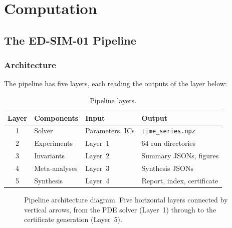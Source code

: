 \documentclass[11pt,twoside,openright]{book}
\theoremstyle{definition}
\theoremstyle{plain}
\theoremstyle{definition}
\theoremstyle{remark}
\begin{document}
\part{Computation}\label{part:computation}

\chapter{The ED-SIM-01 Pipeline}\label{ch:pipeline}

\section{Architecture}

The pipeline has five layers, each reading the outputs of the layer below:

\begin{table}[ht]
\centering
\caption{Pipeline layers.}\label{tab:pipeline}
\begin{tabular}{@{}clll@{}}
\toprule
Layer & Components & Input & Output \\
\midrule
1 & Solver       & Parameters, ICs     & \texttt{time\_series.npz} \\
2 & Experiments  & Layer~1             & 64 run directories \\
3 & Invariants   & Layer~2             & Summary JSONs, figures \\
4 & Meta-analyses & Layer~3            & Synthesis JSONs \\
5 & Synthesis    & Layer~4             & Report, index, certificate \\
\bottomrule
\end{tabular}
\end{table}

\begin{figure}[ht]
\centering
\caption{Pipeline architecture diagram. Five horizontal layers connected by vertical arrows, from the PDE solver (Layer~1) through to the certificate generation (Layer~5).}
\label{fig:pipeline}
\end{figure}
\end{document}
